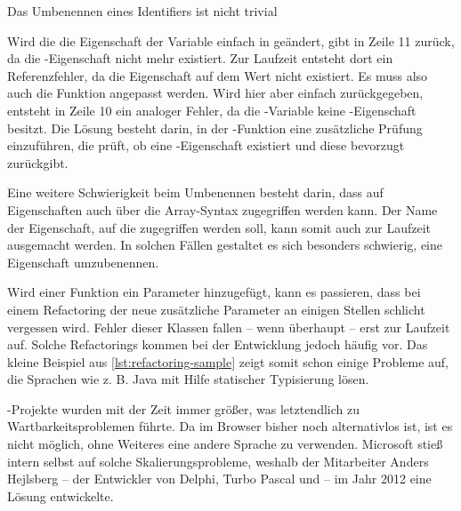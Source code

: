 \documentclass[a4paper]{scrartcl}
\begin{document}
\begin{listing}
	\centering
	\vspace*{-7mm}
	\caption{Das Umbenennen eines Identifiers ist nicht trivial}
	\label{lst:refactoring-sample}
\end{listing}

Wird die die Eigenschaft  der Variable  einfach in  geändert, gibt  in Zeile 11 \tsundefined{} zurück, da die -Eigenschaft nicht mehr existiert.
Zur Laufzeit entsteht dort ein Referenzfehler, da die Eigenschaft  auf dem Wert \tsundefined{} nicht existiert.
Es muss also auch die Funktion  angepasst werden.
Wird hier aber einfach  zurückgegeben, entsteht in Zeile 10 ein analoger Fehler, da die -Variable keine -Eigenschaft besitzt.
Die Lösung besteht darin, in der -Funktion eine zusätzliche Prüfung einzuführen, die prüft, ob eine -Eigenschaft existiert und diese bevorzugt zurückgibt.

Eine weitere Schwierigkeit beim Umbenennen besteht darin, dass auf Eigenschaften auch über die Array-Syntax zugegriffen werden kann.
Der Name der Eigenschaft, auf die zugegriffen werden soll, kann somit auch zur Laufzeit ausgemacht werden.
In solchen Fällen gestaltet es sich besonders schwierig, eine Eigenschaft umzubenennen.

Wird einer Funktion ein Parameter hinzugefügt, kann es passieren, dass bei einem Refactoring der neue zusätzliche Parameter an einigen Stellen schlicht vergessen wird.
Fehler dieser Klassen fallen -- wenn überhaupt -- erst zur Laufzeit auf. Solche Refactorings kommen bei der Entwicklung jedoch häufig vor.
Das kleine Beispiel aus \autoref{lst:refactoring-sample} zeigt somit schon einige Probleme auf, die Sprachen wie z. B. Java mit Hilfe statischer Typisierung lösen.

\js-Projekte wurden mit der Zeit immer größer, was letztendlich zu Wartbarkeitsproblemen führte.
Da \js{} im Browser bisher noch alternativlos ist, ist es nicht möglich, ohne Weiteres eine andere Sprache zu verwenden.
Microsoft stieß intern selbst auf solche Skalierungsprobleme, weshalb der Mitarbeiter Anders Hejlsberg -- der Entwickler von Delphi, Turbo Pascal und \cs{} -- im Jahr 2012 eine Lösung entwickelte.

\section{\ts{}}\label{sec:ts}
\end{document}
